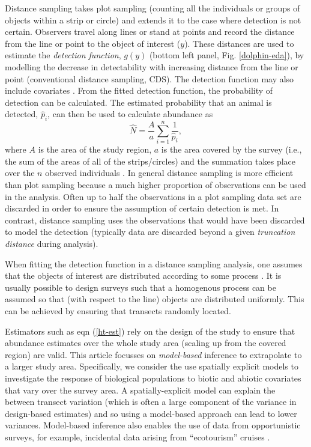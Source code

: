 \documentclass[a4paper,12pt]{article}
\begin{document}
Distance sampling takes plot sampling (counting all the individuals or groups of objects within a strip or circle) and extends it to the case where detection is not certain. Observers travel along lines or stand at points and record the distance from the  line or point to the object of interest ($y$). These distances are used to estimate the \textit{detection function}, $g(y)$ (bottom left panel, Fig. \ref{dolphin-eda}), by modelling the decrease in detectability with increasing distance from the line or point (conventional distance sampling, CDS). The detection function may also include covariates \citep[multiple covariate distance sampling, MCDS;][]{Marques:2007vm}. From the fitted detection function, the probability of detection can be calculated. The estimated probability that an animal is detected, $\hat{p}_i$, can then be used to calculate abundance as
\begin{equation}
\hat{N} = \frac{A}{a} \sum_{i=1}^{n} \frac{1}{\hat{p}_i},
\label{ht-est}
\end{equation}
where $A$ is the area of the study region, $a$ is the area covered by the survey (i.e., the sum of the areas of all of the strips/circles) and the summation takes place over the $n$ observed individuals \citep[Chapter 3]{Buckland:2001vm}. In general distance sampling is more efficient than plot sampling because a much higher proportion of observations can be used in the analysis. Often up to half the observations in a plot sampling data set are discarded in order to ensure the assumption of certain detection is met. In contrast, distance sampling uses the observations that would have been discarded to model the detection (typically data are discarded beyond a given \textit{truncation distance} during analysis).

When fitting the detection function in a distance sampling analysis, one assumes that the objects of interest are distributed according to some process \citep[Section 2.1]{Buckland:2001vm}. It is usually possible to design surveys such that a homogenous process can be assumed so that (with respect to the line) objects are distributed uniformly. This can be achieved by ensuring that  transects randomly located.

Estimators such as eqn (\ref{ht-est}) rely on the design of the study to ensure that abundance estimates over the whole study area (scaling up from the covered region) are valid. This article focusses on \textit{model-based} inference to extrapolate to a larger study area. Specifically, we consider the use spatially explicit models to investigate the response of biological populations to biotic and abiotic covariates that vary over the survey area. A spatially-explicit model can explain the between transect variation (which is often a large component of the variance in design-based estimates) and so using a model-based approach can lead to lower variances. Model-based inference also enables the use of data from opportunistic surveys, for example, incidental data arising from ``ecotourism'' cruises \citep{Williams:2006tz}. 
\end{document}

